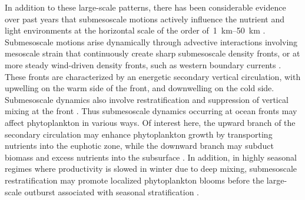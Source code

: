 In addition to these large-scale patterns, there has been considerable evidence over past years that submesoscale motions actively influence the nutrient and light environments at the horizontal scale of the order of~\qtyrange[range-phrase=--]{1}{50}{\km} \parencite[see reviews by][]{levy_2012, mahadevan_2016, levy_2018}.
Submesoscale motions arise dynamically through advective interactions involving mesoscale strain that continuously create sharp submesoscale density fronts, or at more steady wind-driven density fronts, such as western boundary currents \parencite{thomas_2008, mcwilliams_2016, mahadevan_2020}.
These fronts are characterized by an energetic secondary vertical circulation, with upwelling on the warm side of the front, and downwelling on the cold side.
Submesoscale dynamics also involve restratification and suppression of vertical mixing at the front \parencite{thomas_2008a}.
Thus submesoscale dynamics occurring at ocean fronts may affect phytoplankton in various ways.
Of interest here, the upward branch of the secondary circulation may enhance phytoplankton growth by transporting nutrients into the euphotic zone, while the downward branch may subduct biomass and excess nutrients into the subsurface \parencite{calil_2011, omand_2015, hauschildt_2021}.
In addition, in highly seasonal regimes where productivity is slowed in winter due to deep mixing, submesoscale restratification may promote localized phytoplankton blooms before the large-scale outburst associated with seasonal stratification \parencite{mahadevan_2012}.

